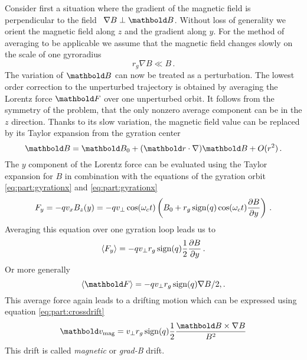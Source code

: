Consider first a situation where the gradient
of the magnetic field is perpendicular to the field \ie\ $\nabla B\perp\mb B$.
Without loss of generality we orient the magnetic field along $z$ and
the gradient along $y$.
For the method of averaging to be applicable we assume that the magnetic
field changes
slowly on the scale of one gyroradius \ie
\begin{equation}
r_g\nabla B \ll B\,.
\end{equation}
The variation of $\mb B$ can now be treated as a perturbation. The lowest
order correction to the unperturbed trajectory is obtained by averaging
the Lorentz force $\mb F$ over one unperturbed orbit. It follows from the
symmetry
of the problem, that the only nonzero average component can be in the $z$
direction. Thanks to its slow variation, the magnetic field value can be
replaced by its Taylor expansion from the gyration center
\begin{equation}
    \mb B = \mb B_0 + (\mb r\cdot\nabla)\mb B + O(r^2)\,.
\end{equation}
The $y$ component of the Lorentz force
can be evaluated using the Taylor expansion
for $B$ in combination with the equations of the gyration orbit
\eqref{eq:part:gyrationx} and \eqref{eq:part:gyrationx}
\begin{equation}
    F_y = -qv_xB_z(y) = -qv_\perp\cos(\omega_c t)
    \left(B_0+r_g\operatorname{sign}(q)\cos(\omega_c t)\frac{\partial B}{\partial y}\right)\,.
\end{equation}
Averaging this equation over one gyration loop leads us to
\begin{equation}
    \left<F_y\right> = -qv_\perp r_g\operatorname{sign}(q)
    \frac{1}{2}\frac{\partial B}{\partial y}\,.
\end{equation}
Or more generally
\begin{equation}
    \left<\mb F\right> = -qv_\perp r_g\sign(q)
    \nabla B/2,.
\end{equation}
This average force again leads to a drifting motion which can be expressed
using equation \eqref{eq:part:crossdrift}
\begin{equation}
    \mb v_{\text{mag}} = v_\perp r_g \sign(q)\frac{1}{2}
    \frac{\mb B\times\nabla B}{B^2}
\end{equation}
This drift is called {\em magnetic} or {\em grad-B} drift.

